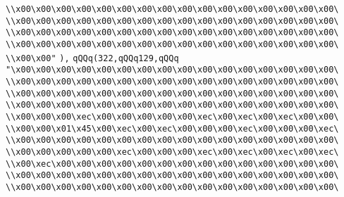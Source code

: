 \verb|\\x00\x00\x00\x00\x00\x00\x00\x00\x00\x00\x00\x00\x00\x00\x00\x00\|\newline
\verb|\\x00\x00\x00\x00\x00\x00\x00\x00\x00\x00\x00\x00\x00\x00\x00\x00\|\newline
\verb|\\x00\x00\x00\x00\x00\x00\x00\x00\x00\x00\x00\x00\x00\x00\x00\x00\|\newline
\verb|\\x00\x00\x00\x00\x00\x00\x00\x00\x00\x00\x00\x00\x00\x00\x00\x00\|\newline
\verb|\\x00\x00"|\newline
\verb|),|\newline
\verb|qQQq(322,qQQq129,qQQq|\newline
\verb|"\x00\x00\x00\x00\x00\x00\x00\x00\x00\x00\x00\x00\x00\x00\x00\x00\|\newline
\verb|\\x00\x00\x00\x00\x00\x00\x00\x00\x00\x00\x00\x00\x00\x00\x00\x00\|\newline
\verb|\\x00\x00\x00\x00\x00\x00\x00\x00\x00\x00\x00\x00\x00\x00\x00\x00\|\newline
\verb|\\x00\x00\x00\x00\x00\x00\x00\x00\x00\x00\x00\x00\x00\x00\x00\x00\|\newline
\verb|\\x00\x00\x00\xec\x00\x00\x00\x00\x00\xec\x00\xec\x00\xec\x00\x00\|\newline
\verb|\\x00\x00\x01\x45\x00\xec\x00\xec\x00\x00\x00\xec\x00\x00\x00\xec\|\newline
\verb|\\x00\x00\x00\x00\x00\x00\x00\x00\x00\x00\x00\x00\x00\x00\x00\x00\|\newline
\verb|\\x00\x00\x00\x00\x00\xec\x00\x00\x00\xec\x00\xec\x00\xec\x00\xec\|\newline
\verb|\\x00\xec\x00\x00\x00\x00\x00\x00\x00\x00\x00\x00\x00\x00\x00\x00\|\newline
\verb|\\x00\x00\x00\x00\x00\x00\x00\x00\x00\x00\x00\x00\x00\x00\x00\x00\|\newline
\verb|\\x00\x00\x00\x00\x00\x00\x00\x00\x00\x00\x00\x00\x00\x00\x00\x00\|\newline
